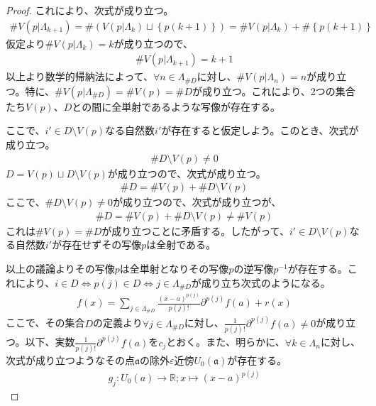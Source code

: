 \documentclass[dvipdfmx]{jsarticle}
\begin{document}
\begin{proof}
これにより、次式が成り立つ。
\begin{align*}
\#{V\left( p|\varLambda_{k + 1} \right)} = \#\left( V\left( p|\varLambda_{k} \right) \sqcup \left\{ p(k + 1) \right\} \right) = \#{V\left( p|\varLambda_{k} \right)} + \#\left\{ p(k + 1) \right\}
\end{align*}
仮定より$\#{V\left( p|\varLambda_{k} \right)} = k$が成り立つので、
\begin{align*}
\#{V\left( p|\varLambda_{k + 1} \right)} = k + 1
\end{align*}
以上より数学的帰納法によって、$\forall n \in \varLambda_{\#D}$に対し、$\#{V\left( p|\varLambda_{n} \right)} = n$が成り立つ。特に、$\#{V\left( p|\varLambda_{\#D} \right)} = \#{V(p)} = \#D$が成り立つ。これにより、2つの集合たち$V(p)$、$D$との間に全単射であるような写像が存在する。\par
ここで、$i' \in D \setminus V(p)$なる自然数$i'$が存在すると仮定しよう。このとき、次式が成り立つ。
\begin{align*}
\#{D \setminus V(p)} \neq 0
\end{align*}
$D = V(p) \sqcup D \setminus V(p)$が成り立つので、次式が成り立つ。
\begin{align*}
\#D = \#{V(p)} + \#{D \setminus V(p)}
\end{align*}
ここで、$\#{D \setminus V(p)} \neq 0$が成り立つので、次式が成り立つが、
\begin{align*}
\#D = \#{V(p)} + \#{D \setminus V(p)} \neq \#{V(p)}
\end{align*}
これは$\#{V(p)} = \#D$が成り立つことに矛盾する。したがって、$i' \in D \setminus V(p)$なる自然数$i'$が存在せずその写像$p$は全射である。\par
以上の議論よりその写像$p$は全単射となりその写像$p$の逆写像$p^{- 1}$が存在する。これにより、$i \in D \Leftrightarrow p(j) \in D \Leftrightarrow j \in \varLambda_{\#D}$が成り立ち次式のようになる。
\begin{align*}
f(x) = \sum_{j \in \varLambda_{\#D}} {\frac{(x - a)^{p(j)}}{p(j)!}\partial^{p(j)}f(a)} + r(x)
\end{align*}
ここで、その集合$D$の定義より$\forall j \in \varLambda_{\#D}$に対し、$\frac{1}{p(j)!}\partial^{p(j)}f(a) \neq 0$が成り立つ。以下、実数$\frac{1}{p(j)!}\partial^{p(j)}f(a)$を$c_{j}$とおく。また、明らかに、$\forall k \in \varLambda_{n}$に対し、次式が成り立つようなその点$\mathfrak{a}$の除外$\varepsilon$近傍$U_{0}\left( \mathfrak{a} \right)$が存在する。
\begin{align*}
g_{j}:U_{0}(a) \rightarrow \mathbb{R};x \mapsto (x - a)^{p(j)}

\end{align*}
\end{proof}
\end{document}
